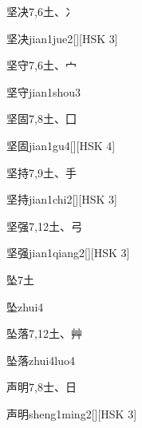 \begin{entry}{坚决}{7,6}{⼟、⼎}
  \begin{phonetics}{坚决}{jian1jue2}[][HSK 3]
  \end{phonetics}
\end{entry}

\begin{entry}{坚守}{7,6}{⼟、⼧}
  \begin{phonetics}{坚守}{jian1shou3}
  \end{phonetics}
\end{entry}

\begin{entry}{坚固}{7,8}{⼟、⼞}
  \begin{phonetics}{坚固}{jian1gu4}[][HSK 4]
  \end{phonetics}
\end{entry}

\begin{entry}{坚持}{7,9}{⼟、⼿}
  \begin{phonetics}{坚持}{jian1chi2}[][HSK 3]
  \end{phonetics}
\end{entry}

\begin{entry}{坚强}{7,12}{⼟、⼸}
  \begin{phonetics}{坚强}{jian1qiang2}[][HSK 3]
  \end{phonetics}
\end{entry}

\begin{entry}{坠}{7}{⼟}
  \begin{phonetics}{坠}{zhui4}
  \end{phonetics}
\end{entry}

\begin{entry}{坠落}{7,12}{⼟、⾋}
  \begin{phonetics}{坠落}{zhui4luo4}
  \end{phonetics}
\end{entry}

\begin{entry}{声明}{7,8}{⼠、⽇}
  \begin{phonetics}{声明}{sheng1ming2}[][HSK 3]
  \end{phonetics}
\end{entry}

